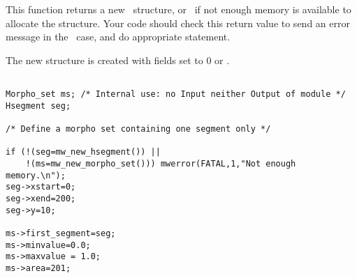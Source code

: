 \newpage %


\Description
This function returns a new \mset\ structure, or \Null\ if not enough 
memory is available to allocate the structure. 
Your code should check this return value to send an error message in the 
\Null\ case, and do appropriate statement.

The new structure is created with fields set to $0$ or \Null.

\Next
\Example
\begin{verbatim}

Morpho_set ms; /* Internal use: no Input neither Output of module */
Hsegment seg;

/* Define a morpho set containing one segment only */

if (!(seg=mw_new_hsegment()) ||
    !(ms=mw_new_morpho_set())) mwerror(FATAL,1,"Not enough memory.\n");
seg->xstart=0; 
seg->xend=200;
seg->y=10;

ms->first_segment=seg;
ms->minvalue=0.0;
ms->maxvalue = 1.0;
ms->area=201;
\end{verbatim}

\newpage %


